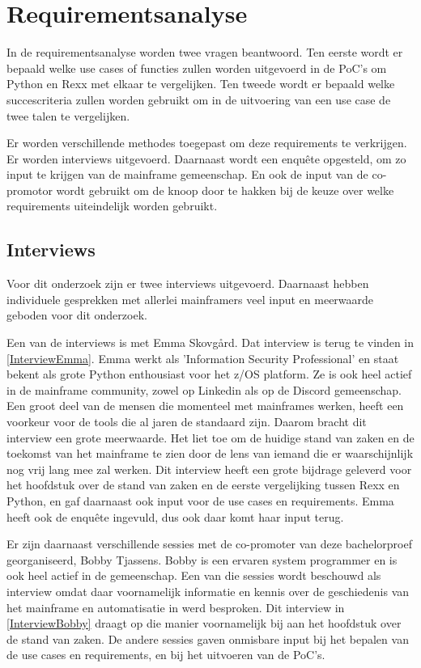 \chapter{Requirementsanalyse}%
\label{ch:requirementsanalyse}


In de requirementsanalyse worden twee vragen beantwoord. Ten eerste wordt er bepaald welke use cases of functies zullen worden uitgevoerd in de PoC's om Python en Rexx met elkaar te vergelijken. Ten tweede wordt er bepaald welke succescriteria zullen worden gebruikt om in de uitvoering van een use case de twee talen te vergelijken.

Er worden verschillende methodes toegepast om deze requirements te verkrijgen. Er worden interviews uitgevoerd. Daarnaast wordt een enquête opgesteld, om zo input te krijgen van de mainframe gemeenschap. En ook de input van de co-promotor wordt gebruikt om de knoop door te hakken bij de keuze over welke requirements uiteindelijk worden gebruikt.

\section{Interviews}
Voor dit onderzoek zijn er twee interviews uitgevoerd. Daarnaast hebben individuele gesprekken met allerlei mainframers veel input en meerwaarde geboden voor dit onderzoek. 

Een van de interviews is met Emma Skovgård. Dat interview is terug te vinden in \ref{InterviewEmma}. Emma werkt als 'Information Security Professional' en staat bekent als grote Python enthousiast voor het z/OS platform. Ze is ook heel actief in de mainframe community, zowel op Linkedin als op de Discord gemeenschap. Een groot deel van de mensen die momenteel met mainframes werken, heeft een voorkeur voor de tools die al jaren de standaard zijn. Daarom bracht dit interview een grote meerwaarde. Het liet toe om de huidige stand van zaken en de toekomst van het mainframe te zien door de lens van iemand die er waarschijnlijk nog vrij lang mee zal werken. Dit interview heeft een grote bijdrage geleverd voor het hoofdstuk over de stand van zaken en de eerste vergelijking tussen Rexx en Python, en gaf daarnaast ook input voor de use cases en requirements. Emma heeft ook de enquête ingevuld, dus ook daar komt haar input terug.

Er zijn daarnaast verschillende sessies met de co-promoter van deze bachelorproef georganiseerd, Bobby Tjassens. Bobby is een ervaren system programmer en is ook heel actief in de gemeenschap. Een van die sessies wordt beschouwd als interview omdat daar voornamelijk informatie en kennis over de geschiedenis van het mainframe en automatisatie in werd besproken. Dit interview in \ref{InterviewBobby} draagt op die manier voornamelijk bij aan het hoofdstuk over de stand van zaken. De andere sessies gaven onmisbare input bij het bepalen van de use cases en requirements, en bij het uitvoeren van de PoC's.

